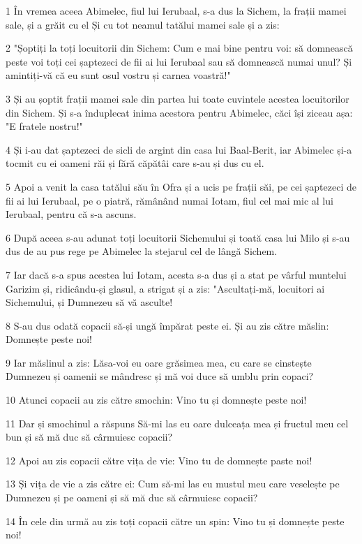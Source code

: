 \par 1 În vremea aceea Abimelec, fiul lui Ierubaal, s-a dus la Sichem, la frații mamei sale, și a grăit cu el Și cu tot neamul tatălui mamei sale și a zis:
\par 2 "Șoptiți la toți locuitorii din Sichem: Cum e mai bine pentru voi: să domnească peste voi toți cei șaptezeci de fii ai lui Ierubaal sau să domnească numai unul? Și amintiți-vă că eu sunt osul vostru și carnea voastră!"
\par 3 Și au șoptit frații mamei sale din partea lui toate cuvintele acestea locuitorilor din Sichem. Și s-a înduplecat inima acestora pentru Abimelec, căci își ziceau așa: "E fratele nostru!"
\par 4 Și i-au dat șaptezeci de sicli de argint din casa lui Baal-Berit, iar Abimelec și-a tocmit cu ei oameni răi și fără căpătâi care s-au și dus cu el.
\par 5 Apoi a venit la casa tatălui său în Ofra și a ucis pe frații săi, pe cei șaptezeci de fii ai lui Ierubaal, pe o piatră, rămânând numai Iotam, fiul cel mai mic al lui Ierubaal, pentru că s-a ascuns.
\par 6 După aceea s-au adunat toți locuitorii Sichemului și toată casa lui Milo și s-au dus de au pus rege pe Abimelec la stejarul cel de lângă Sichem.
\par 7 Iar dacă s-a spus acestea lui Iotam, acesta s-a dus și a stat pe vârful muntelui Garizim și, ridicându-și glasul, a strigat și a zis: "Ascultați-mă, locuitori ai Sichemului, și Dumnezeu să vă asculte!
\par 8 S-au dus odată copacii să-și ungă împărat peste ei. Și au zis către măslin: Domnește peste noi!
\par 9 Iar măslinul a zis: Lăsa-voi eu oare grăsimea mea, cu care se cinstește Dumnezeu și oamenii se mândresc și mă voi duce să umblu prin copaci?
\par 10 Atunci copacii au zis către smochin: Vino tu și domnește peste noi!
\par 11 Dar și smochinul a răspuns Să-mi las eu oare dulceața mea și fructul meu cel bun și să mă duc să cârmuiesc copacii?
\par 12 Apoi au zis copacii către vița de vie: Vino tu de domnește paste noi!
\par 13 Și vița de vie a zis către ei: Cum să-mi las eu mustul meu care veselește pe Dumnezeu și pe oameni și să mă duc să cârmuiesc copacii?
\par 14 În cele din urmă au zis toți copacii către un spin: Vino tu și domnește peste noi!
